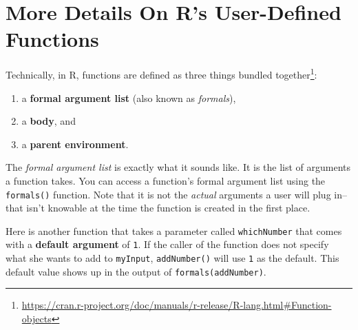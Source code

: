 \documentclass[12pt,krantz2]{krantz}
\makeatletter
\newenvironment{Shaded}{\begin{snugshade}}{\end{snugshade}}
\newcommand{\CommentTok}[1]{\textcolor[rgb]{0.37,0.37,0.37}{\textit{#1}}}
\newcommand{\ControlFlowTok}[1]{\textcolor[rgb]{0.27,0.27,0.27}{\textbf{#1}}}
\newcommand{\DataTypeTok}[1]{\textcolor[rgb]{0.27,0.27,0.27}{#1}}
\newcommand{\DecValTok}[1]{\textcolor[rgb]{0.06,0.06,0.06}{#1}}
\newcommand{\KeywordTok}[1]{\textcolor[rgb]{0.27,0.27,0.27}{\textbf{#1}}}
\newcommand{\NormalTok}[1]{#1}
\newcommand{\OperatorTok}[1]{\textcolor[rgb]{0.43,0.43,0.43}{\textbf{#1}}}
\newcommand{\StringTok}[1]{\textcolor[rgb]{0.5,0.5,0.5}{#1}}
\providecommand{\tightlist}{%
  \setlength{\itemsep}{0pt}\setlength{\parskip}{0pt}}
\renewcommand{\href}[2]{#2\footnote{\url{#1}}}
\newenvironment{kframe}{%
\medskip{}
\setlength{\fboxsep}{.8em}
 \def\at@end@of@kframe{}%
 \ifinner\ifhmode%
  \def\at@end@of@kframe{\end{minipage}}%
  \begin{minipage}{\columnwidth}%
 \fi\fi%
 \def\FrameCommand##1{\hskip\@totalleftmargin \hskip-\fboxsep
 \colorbox{shadecolor}{##1}\hskip-\fboxsep
     \hskip-\linewidth \hskip-\@totalleftmargin \hskip\columnwidth}%
 \MakeFramed {\advance\hsize-\width
   \@totalleftmargin\z@ \linewidth\hsize
   \@setminipage}}%
 {\par\unskip\endMakeFramed%
 \at@end@of@kframe}
\renewenvironment{Shaded}{\begin{kframe}}{\end{kframe}}
\makeatother
\begin{document}
\hypertarget{more-details-on-rs-user-defined-functions}{%
\section{More Details On R's User-Defined Functions}\label{more-details-on-rs-user-defined-functions}}

Technically, in R, functions are \href{https://cran.r-project.org/doc/manuals/r-release/R-lang.html\#Function-objects}{defined as three things bundled together}:

\begin{enumerate}
\def\labelenumi{\arabic{enumi}.}
\tightlist
\item
  a \textbf{formal argument list} (also known as \emph{formals}),
\item
  a \textbf{body}, and
\item
  a \textbf{parent environment}.
\end{enumerate}

The \emph{formal argument list} is exactly what it sounds like. It is the list of arguments a function takes. You can access a function's formal argument list using the \texttt{formals()} function. Note that it is not the \emph{actual} arguments a user will plug in--that isn't knowable at the time the function is created in the first place.

Here is another function that takes a parameter called \texttt{whichNumber} that comes with a \textbf{default argument} of \texttt{1}. If the caller of the function does not specify what she wants to add to \texttt{myInput}, \texttt{addNumber()} will use \texttt{1} as the default. This default value shows up in the output of \texttt{formals(addNumber)}.

\begin{Shaded}
\end{Shaded}
\end{document}
